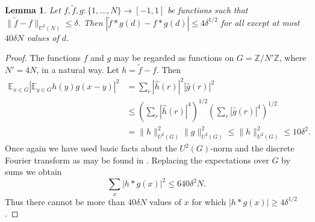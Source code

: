 \documentclass[10pt,reqno]{amsart}
\newtheorem{lemma}[theorem]{Lemma}
\theoremstyle{definition}
\theoremstyle{remark}
\renewcommand{\leq}{\leqslant}
\renewcommand{\geq}{\geqslant}
\def\Z{\mathbb{Z}}
\def\E{\mathbb{E}}
\numberwithin{equation}{section}
\begin{document}
\begin{lemma}\label{gowers-error}
Let $f, \tilde f,g : \{1,\dots,N\} \to [-1,1]$ be functions such that $\| \tilde f - f \|_{U^2(N)} \leq \delta$. Then $|\tilde f \ast g(d) - f \ast g(d)| \leq 4\delta^{1/2} $ for all except at most $40\delta N$ values of $d$. 
\end{lemma}
\begin{proof}
The functions $f$ and $g$ may be regarded as functions on $G = \Z/N'\Z$, where $N' = 4N$, in a natural way. Let $h = \tilde f - f$. Then
\begin{align*}
\E_{x \in G} | \E_{y \in G} h(y) g(x-y)|^2 & = \sum_r |\hat{h}(r)|^2 |\hat{g}(r)|^2 \\ & \leq \left(\sum_r |\hat{h}(r)|^4 \right)^{1/2} \left(\sum_r |\hat{g}(r)|^4 \right)^{1/2} \\ & = \| h \|_{U^2(G)}^2 \| g \|_{U^2(G)}^2 \leq \| h \|_{U^2(G)}^2 \leq 10 \delta^2.
\end{align*} Once again we have used basic facts about the $U^2(G)$-norm and the discrete Fourier transform as may be found in \cite[Section 4.2]{tv}.
Replacing the expectations over $G$ by sums we obtain
\[ \sum_x |h\ast g(x)|^2 \leq 640 \delta^2 N.\] Thus there cannot be more than $40\delta N$ values of $x$ for which $|h \ast g(x)| \geq 4 \delta^{1/2}$.
\end{proof}













{}

\end{document}

